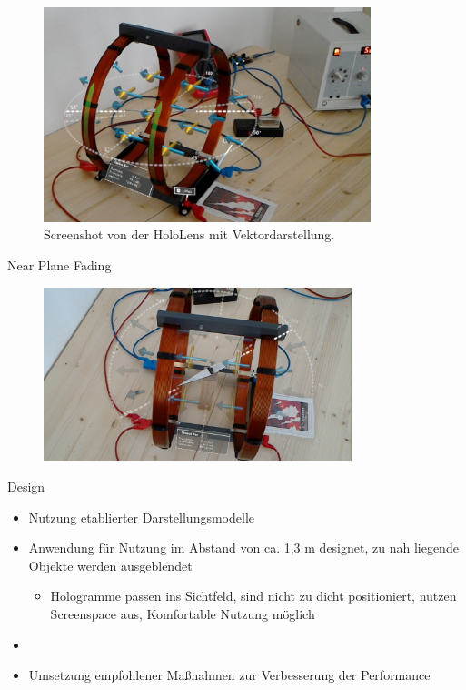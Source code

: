 \begin{frame}[fragile]{}
\begin{figure}
	\vspace{-10px}
	\centering
	\includegraphics[width=0.85\textwidth]{images/HL/Vektoren.jpg}\\
	\scriptsize Screenshot von der HoloLens mit Vektordarstellung.
\end{figure}
\end{frame}

\begin{frame}[fragile]{Near Plane Fading}
\begin{figure}
	\includegraphics[width=0.8\textwidth]{images/HL/compass.jpg}
\end{figure}
\end{frame}

\begin{frame}[fragile]{Design}
\begin{itemize}
	\item Nutzung etablierter Darstellungsmodelle
	\pause
	\item Anwendung für Nutzung im Abstand von ca. 1,3 m designet, zu nah liegende Objekte werden ausgeblendet
	\begin{itemize}
		\item Hologramme passen ins Sichtfeld, sind nicht zu dicht positioniert, nutzen Screenspace aus, Komfortable Nutzung möglich
	\end{itemize}
	\pause
	\item 
	\pause
	\item Umsetzung empfohlener Maßnahmen zur Verbesserung der Performance
\end{itemize}
\end{frame}


